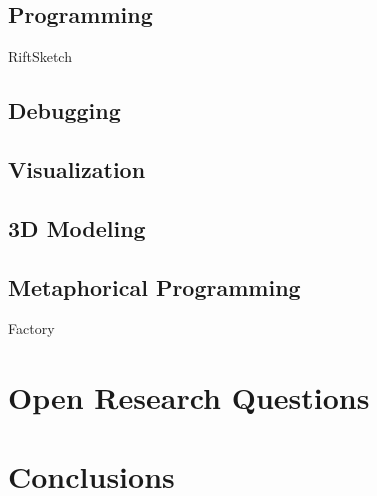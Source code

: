 \documentclass{acm_proc_article-sp}
\begin{document}
\subsection{Programming}
RiftSketch
\subsection{Debugging}
\subsection{Visualization}
\subsection{3D Modeling}
\subsection{Metaphorical Programming}
Factory

\section{Open Research Questions}
\section{Conclusions}



\end{document}
